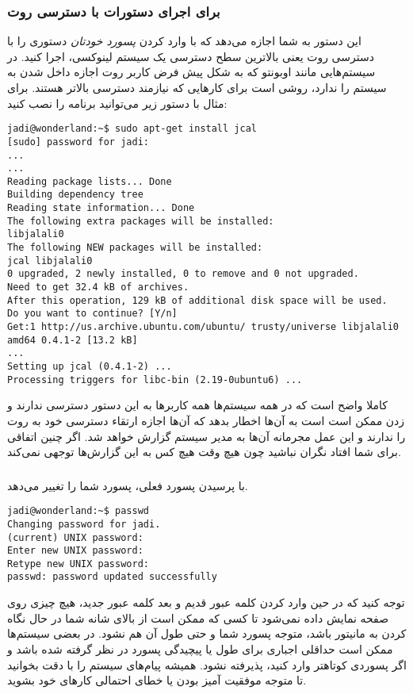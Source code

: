 \subsubsection*{
 برای اجرای دستورات با دسترسی روت}
این دستور به شما اجازه می‌دهد که با وارد کردن
\emph{پسورد خودتان}
دستوری را با دسترسی روت یعنی بالاترین سطح دسترسی یک سیستم لینوکسی، اجرا کنید. در سیستم‌هایی مانند اوبونتو که به شکل پیش فرض کاربر روت اجازه داخل شدن به سیستم را ندارد، 
 روشی است برای کارهایی که نیازمند دسترسی بالاتر هستند. برای مثال با دستور زیر می‌توانید برنامه 
 را نصب کنید:
\begin{frameng}
\begin{lstlisting}
jadi@wonderland:~$ sudo apt-get install jcal
[sudo] password for jadi: 
...
...
Reading package lists... Done
Building dependency tree       
Reading state information... Done
The following extra packages will be installed:
libjalali0
The following NEW packages will be installed:
jcal libjalali0
0 upgraded, 2 newly installed, 0 to remove and 0 not upgraded.
Need to get 32.4 kB of archives.
After this operation, 129 kB of additional disk space will be used.
Do you want to continue? [Y/n] 
Get:1 http://us.archive.ubuntu.com/ubuntu/ trusty/universe libjalali0 amd64 0.4.1-2 [13.2 kB]
...
Setting up jcal (0.4.1-2) ...
Processing triggers for libc-bin (2.19-0ubuntu6) ...
\end{lstlisting}
\end{frameng}

کاملا واضح است که در همه سیستم‌ها همه کاربرها به این دستور دسترسی ندارند و زدن 
 ممکن است است به آن‌ها اخطار بدهد که آن‌ها اجازه ارتقاء دسترسی خود به روت را ندارند و این عمل مجرمانه آن‌ها به مدیر سیستم گزارش خواهد شد. اگر چنین اتفاقی برای شما افتاد نگران نباشید چون هیچ ‌وقت هیچ کس به این گزارش‌ها توجهی نمی‌کند.
\subsubsection*{}
با پرسیدن پسورد فعلی، پسورد شما را تغییر می‌دهد.
\begin{frameng}
\begin{lstlisting}
jadi@wonderland:~$ passwd
Changing password for jadi.
(current) UNIX password: 
Enter new UNIX password: 
Retype new UNIX password: 
passwd: password updated successfully
\end{lstlisting}
\end{frameng}

توجه کنید که در حین وارد کردن کلمه عبور قدیم و بعد کلمه عبور جدید، هیچ چیزی روی صفحه نمایش داده نمی‌شود تا کسی که ممکن است از بالای شانه شما در حال نگاه کردن به مانیتور باشد، متوجه پسورد شما و حتی طول آن هم نشود.
در بعضی سیستم‌ها ممکن است حداقلی اجباری برای طول یا پیچیدگی پسورد در نظر گرفته شده باشد و اگر پسوردی کوتاهتر وارد کنید، پذیرفته نشود. همیشه پیام‌های سیستم را با دقت بخوانید تا متوجه موفقیت آمیز بودن یا خطای احتمالی کارهای خود بشوید.
